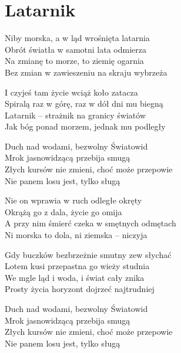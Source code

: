 \section{Latarnik}
\begin{text}
    Niby morska, a w ląd wrośnięta latarnia\\
    Obrót światła w samotni lata odmierza\\
    Na zmianę to morze, to ziemię ogarnia\\
    Bez zmian w zawieszeniu na skraju wybrzeża

    I czyjeś tam życie wciąż koło zatacza\\
    Spiralą raz w górę, raz w dół dni mu biegną\\
    Latarnik -- strażnik na granicy światów\\
    Jak bóg ponad morzem, jednak mu podległy

    Duch nad wodami, bezwolny Światowid\\
    Mrok jasnowidzącą przebija smugą\\
    Złych kursów nie zmieni, choć może przepowie\\
    Nie panem losu jest, tylko sługą

    Nie on wprawia w ruch odległe okręty\\
    Okrążą go z dala, życie go omija\\
    A przy nim śmierć czeka w smętnych odmętach\\
    Ni morska to dola, ni ziemska -- niczyja

    Gdy buczków bezbrzeżnie smutny zew słychać\\
    Lotem kusi przepastna go wieży studnia\\
    We mgle ląd i woda, i świat cały znika\\
    Prosty życia horyzont dojrzeć najtrudniej

    Duch nad wodami, bezwolny Światowid\\
    Mrok jasnowidzącą przebija smugą\\
    Złych kursów nie zmieni, choć może przepowie\\
    Nie panem losu jest, tylko sługą
\end{text}